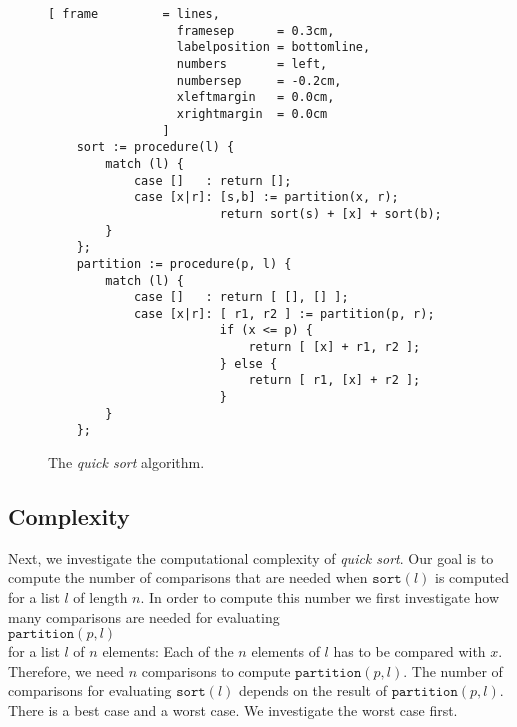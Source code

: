 \begin{figure}[!ht]
  \centering
\begin{Verbatim}[ frame         = lines, 
                  framesep      = 0.3cm, 
                  labelposition = bottomline,
                  numbers       = left,
                  numbersep     = -0.2cm,
                  xleftmargin   = 0.0cm,
                  xrightmargin  = 0.0cm
                ]
    sort := procedure(l) {
        match (l) {
            case []   : return [];
            case [x|r]: [s,b] := partition(x, r);
                        return sort(s) + [x] + sort(b);
        }
    };
    partition := procedure(p, l) {
        match (l) {
            case []   : return [ [], [] ];
            case [x|r]: [ r1, r2 ] := partition(p, r);
                        if (x <= p) {
                            return [ [x] + r1, r2 ];
                        } else {
                            return [ r1, [x] + r2 ];
                        }    
        }
    };
\end{Verbatim}
\vspace*{-0.3cm}
  \caption{The \emph{quick sort} algorithm.}
  \label{fig:quick-sort.stlx}
\end{figure}

\subsection{Complexity}
Next, we investigate the computational complexity of \emph{quick sort}.
Our goal is to compute the number of comparisons that are needed when
$\texttt{sort}(l)$ is computed for a list $l$ of length $n$.  In order to compute this number we
first investigate how many comparisons are needed for evaluating
\\[0.2cm]
\hspace*{1.3cm}
$\texttt{partition}(p,l)$ 
\\[0.2cm]
for a list $l$ of $n$ elements: Each of the $n$ elements of $l$ has to be compared with $x$.
Therefore,  we need $n$ comparisons to compute $\mathtt{partition}(p,l)$.  The number of comparisons
for evaluating $\mathtt{sort}(l)$ depends on the result of $\texttt{partition}(p,l)$.  There is a
best case and a worst case.  We investigate the worst case first.

